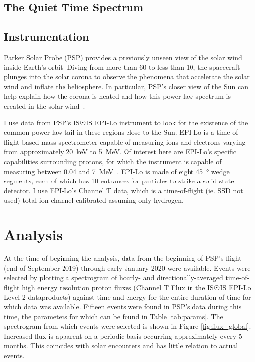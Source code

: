 \documentclass[letterpaper,11pt]{article}
\begin{document}
\subsection{The Quiet Time Spectrum}


\subsection{Instrumentation}
Parker Solar Probe (PSP) provides a previously unseen view of the solar wind inside Earth's orbit.  Diving from more than 60 to less than \SI{10}{\solarradius}, the spacecraft plunges into the solar corona to observe the phenomena that accelerate the solar wind and inflate the heliosphere.  In particular, PSP's closer view of the Sun can help explain how the corona is heated and how this power law spectrum is created in the solar wind~\citep{McComas2014,McComas2007}.

I use data from PSP's IS$\Sun$IS EPI-Lo instrument to look for the existence of the common power law tail in these regions close to the Sun.  EPI-Lo is a time-of-flight based mass-spectrometer capable of measuring ions and electrons varying from approximately \SI{20}{\kilo\electronvolt} to \SI{5}{\mega\electronvolt}.  Of interest here are EPI-Lo's specific capabilities surrounding protons, for which the instrument is capable of measuring between 0.04 and \SI{7}{\mega\electronvolt}~\citep{McComas2014}.  EPI-Lo is made of eight \SI{45}{\degree} wedge segments, each of which has 10 entrances for particles to strike a solid state detector.  I use EPI-Lo's Channel T data, which is a time-of-flight (ie. SSD not used) total ion channel calibrated assuming only hydrogen.



\section{Analysis}
\label{sec:analysis}
At the time of beginning the analysis, data from the beginning of PSP's flight (end of September 2019) through early January 2020 were available.  Events were selected by plotting a spectrogram of hourly- and directionally-averaged time-of-flight high energy resolution proton fluxes (Channel T Flux in the IS$\Sun$IS EPI-Lo Level 2 dataproducts) against time and energy for the entire duration of time for which data was available.  Fifteen events were found in PSP's data during this time, the parameters for which can be found in Table \ref{tab:params}.  The spectrogram from which events were selected is shown in Figure \ref{fig:flux_global}.  Increased flux is apparent on a periodic basis occurring approximately every 5 months.  This coincides with solar encounters and has little relation to actual events.
\end{document}
